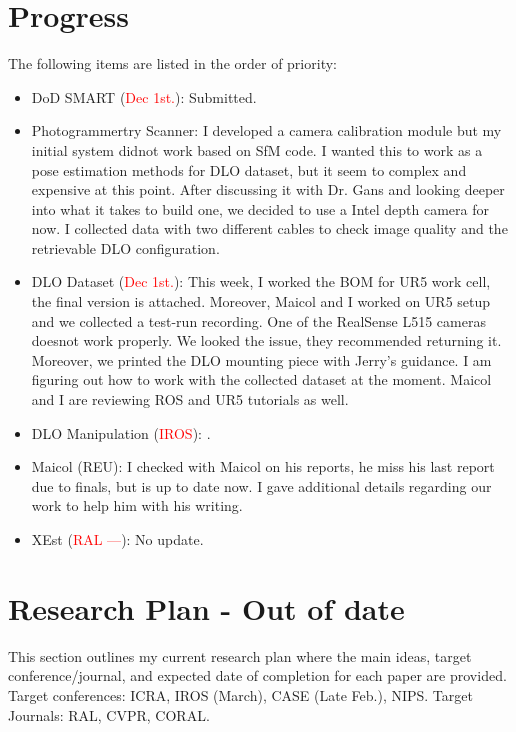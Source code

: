 \documentclass[11pt]{article}
\begin{document}
\section{Progress}
The following items are listed in the order of priority:
\begin{itemize}
  \item DoD SMART (\textcolor{red}{Dec 1st.}): Submitted. \\
  \item Photogrammertry Scanner: I developed a camera calibration module but my
  initial system didnot work based on SfM code. I wanted this to work as a pose estimation
  methods for DLO dataset, but it seem to complex and expensive at this point.
  After discussing it with Dr. Gans and looking deeper into what it takes to
  build one, we decided to use a Intel depth camera for now. I collected data with
  two different cables to check image quality and the retrievable DLO configuration.
  \item DLO Dataset (\textcolor{red}{Dec 1st.}): This week, I worked the BOM for
  UR5 work cell, the final version is attached. Moreover, Maicol and I worked on
  UR5 setup and we collected a test-run recording. One of the RealSense L515 cameras
  doesnot work properly. We looked the issue, they recommended returning it.
  Moreover, we printed the DLO mounting piece with Jerry's guidance.
  I am figuring out how to work with the collected dataset at the moment. Maicol
  and I are reviewing ROS and UR5 tutorials as well.
  \item DLO Manipulation (\textcolor{red}{IROS}): \cite{abraham2017model}.\\
  \item Maicol (REU): I checked with Maicol on his reports, he miss his last
  report due to finals, but is up to date now. I gave additional details regarding
  our work to help him with his writing.\\
  \item XEst (\textcolor{red}{RAL ---}): No update.\\
  \end{itemize}
\newpage

\newpage



\section{Research Plan - Out of date}
This section outlines my current research plan where the main ideas, target
conference/journal, and expected date of completion for each paper
are provided.
Target conferences: ICRA, IROS (March), CASE (Late Feb.), NIPS.
Target Journals: RAL, CVPR, CORAL.
\end{document}
